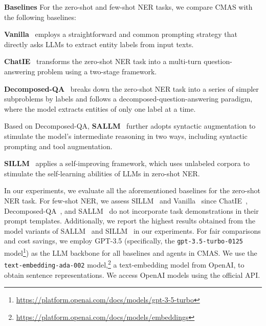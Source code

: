 \noindent \textbf{Baselines}
For the zero-shot and few-shot NER tasks, we compare \ac{CMAS} with the following baselines:
\begin{enumerate*}[label=(\roman*), leftmargin=*,nosep]
    \item \textbf{Vanilla}~\citep{DBLP:conf/emnlp/XieLZZLW23,DBLP:journals/corr/abs-2311-08921} employs a straightforward and common prompting strategy that directly asks LLMs to extract entity labels from input texts.
    \item \textbf{ChatIE}~\citep{wei2023zero} transforms the zero-shot \ac{NER} task into a multi-turn question-answering problem using a two-stage framework.
    \item \textbf{Decomposed-QA}~\citep{DBLP:conf/emnlp/XieLZZLW23} breaks down the zero-shot NER task into a series of simpler subproblems by labels and follows a decomposed-question-answering paradigm, where the model extracts entities of only one label at a time.
    \item Based on Decomposed-QA, \textbf{SALLM}~\citep{DBLP:conf/emnlp/XieLZZLW23} further adopts syntactic augmentation to stimulate the model's intermediate reasoning in two ways, including syntactic prompting and tool augmentation.
    \item \textbf{SILLM}~\citep{DBLP:journals/corr/abs-2311-08921} applies a self-improving framework, which uses unlabeled corpora to stimulate the self-learning abilities of LLMs in zero-shot NER.
\end{enumerate*}

In our experiments, we evaluate all the aforementioned baselines for the zero-shot \ac{NER} task. For few-shot \ac{NER}, we assess SILLM~\cite{DBLP:journals/corr/abs-2311-08921} and Vanilla~\cite{DBLP:conf/emnlp/XieLZZLW23,DBLP:journals/corr/abs-2311-08921} since ChatIE~\cite{wei2023zero}, Decomposed-QA~\cite{DBLP:conf/emnlp/XieLZZLW23}, and SALLM~\cite{DBLP:conf/emnlp/XieLZZLW23} do not incorporate task demonstrations in their prompt templates. 
Additionally, we report the highest results obtained from the model variants of SALLM~\cite{DBLP:conf/emnlp/XieLZZLW23} and SILLM~\cite{DBLP:journals/corr/abs-2311-08921} in our experiments.
For fair comparisons and cost savings, we employ GPT-3.5 (specifically, the \texttt{gpt-3.5-turbo-0125} model\footnote{\url{https://platform.openai.com/docs/models/gpt-3-5-turbo}}) as the LLM backbone for all baselines and agents in \ac{CMAS}. We use the \texttt{text-embedding-ada-002} model,\footnote{\url{https://platform.openai.com/docs/models/embeddings}} a text-embedding model from OpenAI, to obtain sentence representations. We access OpenAI models using the official API.

